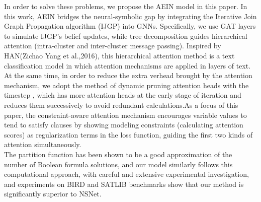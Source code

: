 In order to solve these problems, we propose the AEIN model in this paper. In this work, AEIN bridges 
the neural-symbolic gap by integrating the Iterative Join Graph Propagation  algorithm (IJGP)
\cite{DBLP:journals/corr/abs-1301-0564} into GNNs.   Specifically, we use GAT layers to simulate IJGP's 
belief updates, while tree decomposition guides hierarchical attention (intra-cluster and inter-cluster 
message passing). Inspired by HAN(Zichao Yang et al.,2016)\cite{DBLP:conf/naacl/YangYDHSH16}, this 
hierarchical attention method is a text classification model in which attention mechanisms are applied in 
layers of text. At the same time, in order to reduce the extra verhead brought by the attention mechanism, 
we adopt the method of dynamic pruning attention heads with the timestep\cite{DBLP:conf/icip/LiCLCSQW23}
\cite{DBLP:journals/nn/ZhangLWWW24}, which has more attention heads at the early stage of iteration and 
reduces them successively to avoid redundant calculations.As a focus of this paper, the constraint-aware 
attention mechanism encourages variable values to tend to satisfy clauses by showing modeling constraints 
(calculating attention scores) as regularization terms in the loss function, guiding the first two kinds 
of attention simultaneously. \\

The partition function has been shown to be a good approximation of the number of Boolean formula 
solutions\cite{Bethe_1997_07}\cite{DBLP:journals/siamdm/ChandrasekaranCGSS11}, and our model similarly 
follows this computational approach, with careful and extensive experimental investigation, and experiments 
on BIRD and SATLIB benchmarks show that our method is significantly superior to NSNet. 
